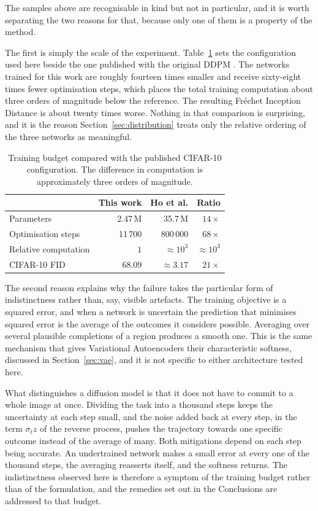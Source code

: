 The samples above are recognisable in kind but not in particular, and it is worth separating the two
reasons for that, because only one of them is a property of the method.

The first is simply the scale of the experiment. Table~\ref{tab:budget} sets the configuration used
here beside the one published with the original DDPM \parencite{arXiv:2006.11239}. The networks
trained for this work are roughly fourteen times smaller and receive sixty-eight times fewer
optimisation steps, which places the total training computation about three orders of magnitude
below the reference. The resulting Fr\'echet Inception Distance is about twenty times worse. Nothing
in that comparison is surprising, and it is the reason Section~\ref{sec:distribution} treats only
the relative ordering of the three networks as meaningful.

\begin{table}[htbp]
    \centering
    \caption{Training budget compared with the published CIFAR-10 configuration. The difference in
    computation is approximately three orders of magnitude.}
    \label{tab:budget}
    \begin{tabular}{lrrr}
        \toprule
        & This work & Ho et al. & Ratio \\
        \midrule
        Parameters & 2.47\,M & 35.7\,M & $14\times$ \\
        Optimisation steps & 11\,700 & 800\,000 & $68\times$ \\
        Relative computation & $1$ & $\approx 10^{3}$ & $\approx 10^{3}$ \\
        CIFAR-10 FID & $68.09$ & $\approx 3.17$ & $21\times$ \\
        \bottomrule
    \end{tabular}
\end{table}

The second reason explains why the failure takes the particular form of indistinctness rather than,
say, visible artefacts. The training objective is a squared error, and when a network is uncertain
the prediction that minimises squared error is the average of the outcomes it considers possible.
Averaging over several plausible completions of a region produces a smooth one. This is the same
mechanism that gives Variational Autoencoders their characteristic softness, discussed in
Section~\ref{sec:vae}, and it is not specific to either architecture tested here.

What distinguishes a diffusion model is that it does not have to commit to a whole image at once.
Dividing the task into a thousand steps keeps the uncertainty at each step small, and the noise
added back at every step, in the term $\sigma_t z$ of the reverse process, pushes the trajectory
towards one specific outcome instead of the average of many. Both mitigations depend on each step
being accurate. An undertrained network makes a small error at every one of the thousand steps, the
averaging reasserts itself, and the softness returns. The indistinctness observed here is therefore
a symptom of the training budget rather than of the formulation, and the remedies set out in the
Conclusions are addressed to that budget.

